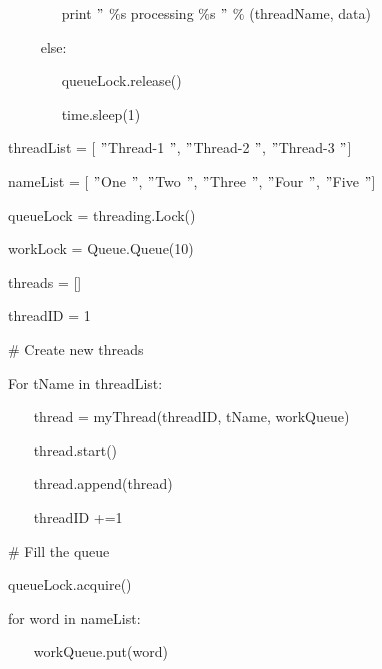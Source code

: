 \noindent 
{\fontsize{10pt}{10pt}\selectfont ~~~~~~~ print  $ " $ $  \%  $s processing  $  \%  $s $ " $  $  \%  $ (threadName, data)} \par
\noindent 
{\fontsize{10pt}{10pt}\selectfont ~~~~ else:} \par
\noindent 
{\fontsize{10pt}{10pt}\selectfont ~~~~~~~ queueLock.release()} \par
\noindent 
{\fontsize{10pt}{10pt}\selectfont ~~~~~~~ time.sleep(1)} \par
\vspace{12pt}
\noindent 
{\fontsize{10pt}{10pt}\selectfont threadList = [ $ " $Thread-1 $ " $,  $ " $Thread-2 $ " $,  $ " $Thread-3 $ " $]} \par
\noindent 
{\fontsize{10pt}{10pt}\selectfont nameList = [ $ " $One $ " $,  $ " $Two $ " $,  $ " $Three $ " $,  $ " $Four $ " $,  $ " $Five $ " $]} \par
\noindent 
{\fontsize{10pt}{10pt}\selectfont queueLock = threading.Lock()} \par
\noindent 
{\fontsize{10pt}{10pt}\selectfont workLock = Queue.Queue(10)} \par
\noindent 
{\fontsize{10pt}{10pt}\selectfont threads = []} \par
\noindent 
{\fontsize{10pt}{10pt}\selectfont threadID = 1} \par
\vspace{10pt}
\noindent 
{\fontsize{10pt}{10pt}\selectfont  $  \#  $ Create new threads} \par
\noindent 
{\fontsize{10pt}{10pt}\selectfont For tName in threadList:} \par
\noindent 
{\fontsize{10pt}{10pt}\selectfont ~~~ thread = myThread(threadID, tName, workQueue)} \par
\noindent 
{\fontsize{10pt}{10pt}\selectfont ~~~ thread.start()} \par
\noindent 
{\fontsize{10pt}{10pt}\selectfont ~~~ thread.append(thread)} \par
\noindent 
{\fontsize{10pt}{10pt}\selectfont ~~~ threadID +=1} \par
\vspace{10pt}
\noindent 
{\fontsize{10pt}{10pt}\selectfont  $  \#  $ Fill the queue} \par
\noindent 
{\fontsize{10pt}{10pt}\selectfont queueLock.acquire()} \par
\noindent 
{\fontsize{10pt}{10pt}\selectfont for word in nameList:} \par
\noindent 
{\fontsize{10pt}{10pt}\selectfont ~~~ workQueue.put(word)} \par
